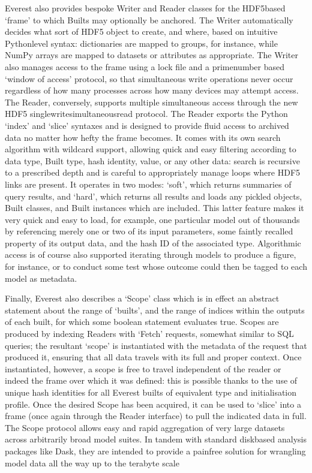 \documentclass[letterpaper,10pt,english]{jupyterBook}
\begin{document}
\sphinxAtStartPar
Everest also provides bespoke Writer and Reader classes for the HDF5\sphinxhyphen{}based ‘frame’ to which Builts may optionally be anchored. The Writer automatically decides what sort of HDF5 object to create, and where, based on intuitive Python\sphinxhyphen{}level syntax: dictionaries are mapped to groups, for instance, while NumPy arrays are mapped to datasets or attributes as appropriate. The Writer also manages access to the frame using a lock file and a prime\sphinxhyphen{}number based ‘window of access’ protocol, so that simultaneous write operations never occur regardless of how many processes across how many devices may attempt access. The Reader, conversely, supports multiple simultaneous access through the new HDF5 single\sphinxhyphen{}write\sphinxhyphen{}simultaneous\sphinxhyphen{}read protocol. The Reader exports the Python ‘index’ and ‘slice’ syntaxes and is designed to provide fluid access to archived data no matter how hefty the frame becomes. It comes with its own search algorithm with wildcard support, allowing quick and easy filtering according to data type, Built type, hash identity, value, or any other data: search is recursive to a prescribed depth and is careful to appropriately manage loops where HDF5 links are present. It operates in two modes: ‘soft’, which returns summaries of query results, and ‘hard’, which returns all results and loads any pickled objects, Built classes, and Built instances which are included. This latter feature makes it very quick and easy to load, for example, one particular model out of thousands by referencing merely one or two of its input parameters, some faintly recalled property of its output data, and the hash ID of the associated type. Algorithmic access is of course also supported \sphinxhyphen{} iterating through models to produce a figure, for instance, or to conduct some test whose outcome could then be tagged to each model as metadata.

\sphinxAtStartPar
Finally, Everest also describes a ‘Scope’ class which is in effect an abstract statement about the range of ‘builts’, and the range of indices within the outputs of each built, for which some boolean statement evaluates true. Scopes are produced by indexing Readers with ‘Fetch’ requests, somewhat similar to SQL queries; the resultant ‘scope’ is instantiated with the metadata of the request that produced it, ensuring that all data travels with its full and proper context. Once instantiated, however, a scope is free to travel independent of the reader or indeed the frame over which it was defined: this is possible thanks to the use of unique hash identities for all Everest builts of equivalent type and initialisation profile. Once the desired Scope has been acquired, it can be used to ‘slice’ into a frame (once again through the Reader interface) to pull the indicated data in full. The Scope protocol allows easy and rapid aggregation of very large datasets across arbitrarily broad model suites. In tandem with standard disk\sphinxhyphen{}based analysis packages like Dask, they are intended to provide a pain\sphinxhyphen{}free solution for wrangling model data all the way up to the terabyte scale
\end{document}
